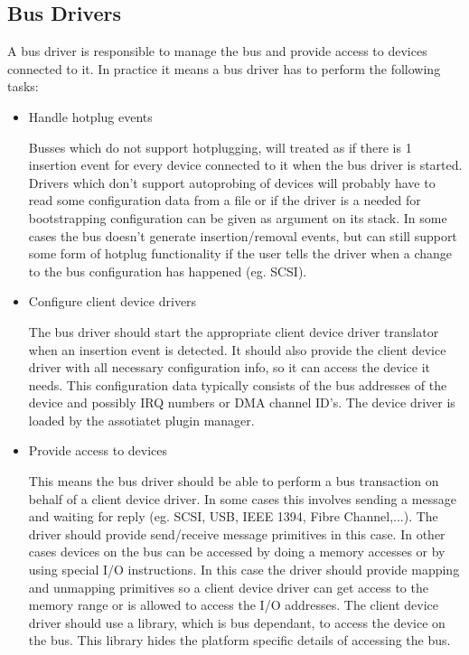 \documentclass[9pt,a4paper]{extarticle}
\begin{document}
\subsection{Bus Drivers}

A bus driver is responsible to manage the bus and provide access to
devices connected to it.  In practice it means a bus driver has to
perform the following tasks:

\begin{itemize}
\item Handle hotplug events
  
  Busses which do not support hotplugging, will treated as if there is
  1 insertion event for every device connected to it when the bus
  driver is started.  Drivers which don't support autoprobing of
  devices will probably have to read some configuration data from a
  file or if the driver is a needed for bootstrapping configuration
  can be given as argument on its stack.  In some cases the bus
  doesn't generate insertion/removal events, but can still support
  some form of hotplug functionality if the user tells the driver when
  a change to the bus configuration has happened (eg. SCSI).

\item Configure client device drivers
    
  The bus driver should start the appropriate client device driver
  translator when an insertion event is detected.  It should also
  provide the client device driver with all necessary configuration
  info, so it can access the device it needs.  This configuration data
  typically consists of the bus addresses of the device and possibly
  IRQ numbers or DMA channel ID's.  The device driver is loaded by the
  assotiatet plugin manager.

\item Provide access to devices
  
  This means the bus driver should be able to perform a bus
  transaction on behalf of a client device driver.  In some cases this
  involves sending a message and waiting for reply (eg. SCSI, USB,
  IEEE 1394, Fibre Channel,...).  The driver should provide
  send/receive message primitives in this case.  In other cases
  devices on the bus can be accessed by doing a memory accesses or by
  using special I/O instructions.  In this case the driver should
  provide mapping and unmapping primitives so a client device driver
  can get access to the memory range or is allowed to access the I/O
  addresses.  The client device driver should use a library, which is
  bus dependant, to access the device on the bus.  This library hides
  the platform specific details of accessing the bus.
  

\end{itemize}
\end{document}
